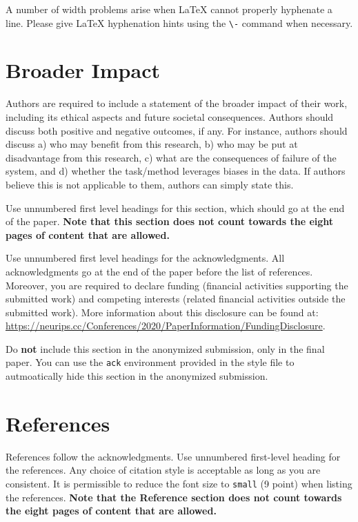 \documentclass{article}
\begin{document}
A number of width problems arise when \LaTeX{} cannot properly hyphenate a
line. Please give LaTeX hyphenation hints using the \verb+\-+ command when
necessary.


\section*{Broader Impact}

Authors are required to include a statement of the broader impact of their work, including its ethical aspects and future societal consequences. 
Authors should discuss both positive and negative outcomes, if any. For instance, authors should discuss a) 
who may benefit from this research, b) who may be put at disadvantage from this research, c) what are the consequences of failure of the system, and d) whether the task/method leverages
biases in the data. If authors believe this is not applicable to them, authors can simply state this.

Use unnumbered first level headings for this section, which should go at the end of the paper. {\bf Note that this section does not count towards the eight pages of content that are allowed.}

\begin{ack}
Use unnumbered first level headings for the acknowledgments. All acknowledgments
go at the end of the paper before the list of references. Moreover, you are required to declare 
funding (financial activities supporting the submitted work) and competing interests (related financial activities outside the submitted work). 
More information about this disclosure can be found at: \url{https://neurips.cc/Conferences/2020/PaperInformation/FundingDisclosure}.


Do {\bf not} include this section in the anonymized submission, only in the final paper. You can use the \texttt{ack} environment provided in the style file to autmoatically hide this section in the anonymized submission.
\end{ack}

\section*{References}

References follow the acknowledgments. Use unnumbered first-level heading for
the references. Any choice of citation style is acceptable as long as you are
consistent. It is permissible to reduce the font size to \verb+small+ (9 point)
when listing the references.
{\bf Note that the Reference section does not count towards the eight pages of content that are allowed.}
\medskip
\end{document}
